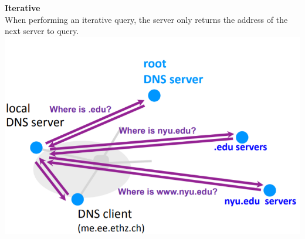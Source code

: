 \documentclass[a4paper, fontsize=8pt, landscape, DIV=1]{scrartcl}
\begin{document}
\begin{multicols*}{4}
		\textbf{Iterative}\\
		When performing an iterative query, the server only returns the address of the next server to query.\\
		\includegraphics[width=\columnwidth]{images/Application_Layer/dns_iterative.png}
		
		
		
		\end{multicols*}
	\setcounter{secnumdepth}{3}
\end{document}
